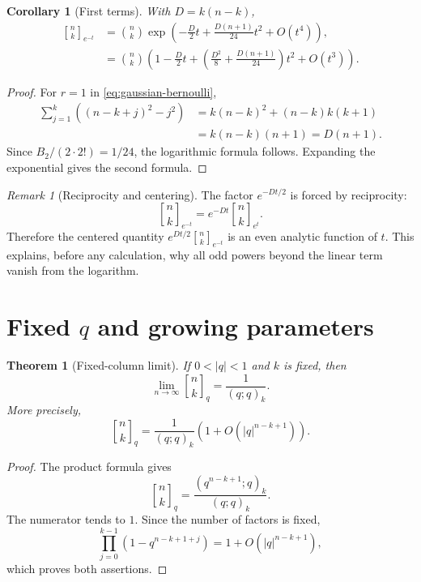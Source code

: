 \documentclass[11pt,oneside,openany]{book}
\newtheorem{theorem}{Theorem}[chapter]
\newtheorem{corollary}[corollary]{Corollary}
\theoremstyle{definition}
\theoremstyle{remark}
\newtheorem{remark}[remark]{Remark}
\newcommand{\qbinom}[2]{\genfrac{[}{]}{0pt}{}{#1}{#2}_{q}}
\newcommand{\Qbinom}[3]{\genfrac{[}{]}{0pt}{}{#1}{#2}_{#3}}
\newcommand{\abs}[1]{\lvert #1\rvert}
\begin{document}
\begin{corollary}[First terms]\label{cor:gaussian-first-asymptotic}
With $D=k(n-k)$,
\begin{align}
 \Qbinom nk{e^{-t}}
 &=\binom nk
 \exp\left(
 -\frac D2t+\frac{D(n+1)}{24}t^2+O(t^4)
 \right),
 \tag{19.3}\label{eq:gaussian-first-asymptotic}\\
 &=\binom nk\left(
 1-\frac D2t+
 \left(\frac{D^2}{8}+\frac{D(n+1)}{24}\right)t^2
 +O(t^3)
 \right).
 \tag{19.4}\label{eq:gaussian-first-expanded}
\end{align}
\end{corollary}

\begin{proof}
For $r=1$ in \eqref{eq:gaussian-bernoulli},
\begin{align*}
 \sum_{j=1}^{k}\left((n-k+j)^2-j^2\right)
 &=k(n-k)^2+(n-k)k(k+1)\\
 &=k(n-k)(n+1)=D(n+1).
\end{align*}
Since $B_2/(2\cdot2!)=1/24$, the logarithmic formula follows.  Expanding the exponential gives the second formula.
\end{proof}

\begin{remark}[Reciprocity and centering]
The factor $e^{-Dt/2}$ is forced by reciprocity:
\[
 \Qbinom nk{e^{-t}}
 =e^{-Dt}\Qbinom nk{e^t}.
\]
Therefore the centered quantity $e^{Dt/2}\Qbinom nk{e^{-t}}$ is an even analytic function of $t$.  This explains, before any calculation, why all odd powers beyond the linear term vanish from the logarithm.
\end{remark}

\section{Fixed \texorpdfstring{$q$}{q} and growing parameters}

\begin{theorem}[Fixed-column limit]\label{thm:fixed-column-limit}
If $0<\abs q<1$ and $k$ is fixed, then
\[
 \lim_{n\to\infty}\qbinom nk=\frac1{(q;q)_k}.
 \tag{19.5}\label{eq:fixed-column-limit}
\]
More precisely,
\[
 \qbinom nk
 =\frac1{(q;q)_k}\left(1+O(\abs q^{n-k+1})\right).
 \tag{19.6}\label{eq:fixed-column-error}
\]
\end{theorem}

\begin{proof}
The product formula gives
\[
 \qbinom nk=\frac{(q^{n-k+1};q)_k}{(q;q)_k}.
\]
The numerator tends to $1$.  Since the number of factors is fixed,
\[
 \prod_{j=0}^{k-1}(1-q^{n-k+1+j})
 =1+O(\abs q^{n-k+1}),
\]
which proves both assertions.
\end{proof}
\end{document}
